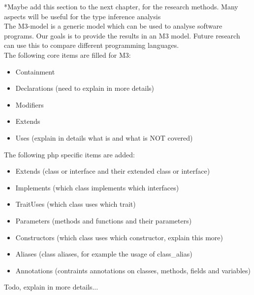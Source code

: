 \documentclass[../main.tex]{subfiles}
\begin{document}
    \footnotesize{*Maybe add this section to the next chapter, for the research methods. Many aspects will be useful for the type inference analysis}
    \\
    The M3-model is a generic model which can be used to analyse software programs.
    Our goals is to provide the results in an M3 model.
    Future research can use this to compare different programming languages.
    \\ 
    The following core items are filled for M3:
    \begin{itemize}
        \item Containment
        \item Declarations (need to explain in more details)
        \item Modifiers
        \item Extends
        \item Uses (explain in details what is and what is NOT covered)
    \end{itemize}
    
    The following php specific items are added:
    \begin{itemize}
        \item Extends (class or interface and their extended class or interface)
        \item Implements (which class implements which interfaces)
        \item TraitUses (which class uses which trait)
        \item Parameters (methods and functions and their parameters)
        \item Constructors (which class uses which constructor, explain this more)
        \item Aliases (class aliases, for example the usage of class\_{}alias)
        \item Annotations (contraints annotations on classes, methods, fields and variables)
    \end{itemize}
    Todo, explain in more details...

    
\end{document}

